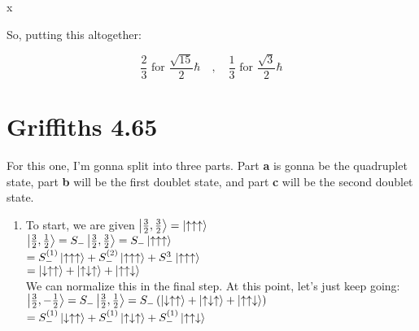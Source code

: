 x\documentclass[12pt]{article}
\begin{document}
\begin{enumerate}[label=\alph*)]
So, putting this altogether:

\[\boxed{\frac{2}{3} \text{ for } \frac{\sqrt{15}}{2}\hbar \quad , \quad \frac{1}{3} \text{ for } \frac{\sqrt{3}}{2}\hbar}\]

\end{enumerate}

\newpage

\section*{Griffiths 4.65}
For this one, I'm gonna split into three parts. Part {\bf a} is gonna be the quadruplet state, part {\bf b} will be the first doublet state, and part {\bf c} will be the second doublet state.

\begin{enumerate}[label=\alph*)]
\item To start, we are given $\ket{\frac{3}{2}, \frac{3}{2}} = \ket{\uparrow\uparrow\uparrow}$\vspace{0.5em}\\
$\ket{\frac{3}{2}, \frac{1}{2}} = S_-\ket{\frac{3}{2}, \frac{3}{2}} = S_- \ket{\uparrow\uparrow\uparrow}$\vspace{0.5em}\\
\hspace*{2.7em}$= S_-^{(1)}\ket{\uparrow\uparrow\uparrow} + S_-^{(2)}\ket{\uparrow\uparrow\uparrow} + S_-^{3}\ket{\uparrow\uparrow\uparrow}$\vspace{0.5em}\\
\hspace*{2.7em} $ = \ket{\downarrow\uparrow\uparrow} + \ket{\uparrow\downarrow\uparrow} + \ket{\uparrow\uparrow\downarrow}$\vspace{0.5em}\\
We can normalize this in the final step. At this point, let's just keep going:\vspace{0.5em}\\
$\ket{\frac{3}{2}, -\frac{1}{2}} = S_-\ket{\frac{3}{2}, \frac{1}{2}} = S_-\left(\ket{\downarrow\uparrow\uparrow} + \ket{\uparrow\downarrow\uparrow} + \ket{\uparrow\uparrow\downarrow}\right)$\vspace{0.5em}\\
\hspace*{3.5em}$=S_-^{(1)}\ket{\downarrow\uparrow\uparrow} + S_-^{(1)}\ket{\uparrow\downarrow\uparrow} + S_-^{(1)}\ket{\uparrow\uparrow\downarrow}$\vspace{0.5em}\\

\end{enumerate}
\end{document}
